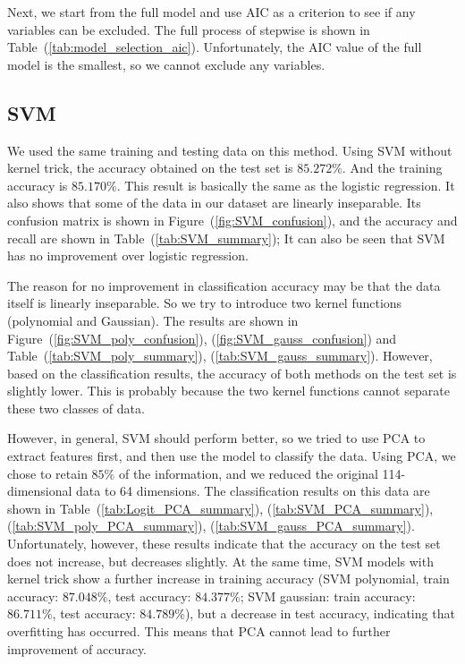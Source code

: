 \documentclass[11pt, a4paper, jou]{apa7}
\begin{document}
    Next, we start from the full model and use AIC as a criterion to see if any variables can be excluded. The full process of stepwise is shown in Table~(\ref{tab:model_selection_aic}). Unfortunately, the AIC value of the full model is the smallest, so we cannot exclude any variables. 

\subsection{SVM}
We used the same training and testing data on this method. Using SVM without kernel trick, the accuracy obtained on the test set is $85.272\%$. And the training accuracy is $85.170\%$. This result is basically the same as the logistic regression. It also shows that some of the data in our dataset are linearly inseparable. Its confusion matrix is shown in Figure~(\ref{fig:SVM_confusion}), and the accuracy and recall are shown in Table~(\ref{tab:SVM_summary}); It can also be seen that SVM has no improvement over logistic regression. 

The reason for no improvement in classification accuracy may be that the data itself is linearly inseparable. So we try to introduce two kernel functions (polynomial and Gaussian). The results are shown in Figure~(\ref{fig:SVM_poly_confusion}), (\ref{fig:SVM_gauss_confusion}) and Table~(\ref{tab:SVM_poly_summary}), (\ref{tab:SVM_gauss_summary}). However, based on the classification results, the accuracy of both methods on the test set is slightly lower. This is probably because the two kernel functions cannot separate these two classes of data. 

However, in general, SVM should perform better, so we tried to use PCA to extract features first, and then use the model to classify the data. Using PCA, we chose to retain $85\%$ of the information, and we reduced the original 114-dimensional data to 64 dimensions. The classification results on this data are shown in Table~(\ref{tab:Logit_PCA_summary}), (\ref{tab:SVM_PCA_summary}), (\ref{tab:SVM_poly_PCA_summary}), (\ref{tab:SVM_gauss_PCA_summary}). 
Unfortunately, however, these results indicate that the accuracy on the test set does not increase, but decreases slightly. At the same time, SVM models with kernel trick show a further increase in training accuracy (SVM polynomial, train accuracy: $87.048\%$, test accuracy: $84.377\%$; SVM gaussian: train accuracy: $86.711\%$, test accuracy: $84.789\%$), but a decrease in test accuracy, indicating that overfitting has occurred. This means that PCA cannot lead to further improvement of accuracy. 
\end{document}
